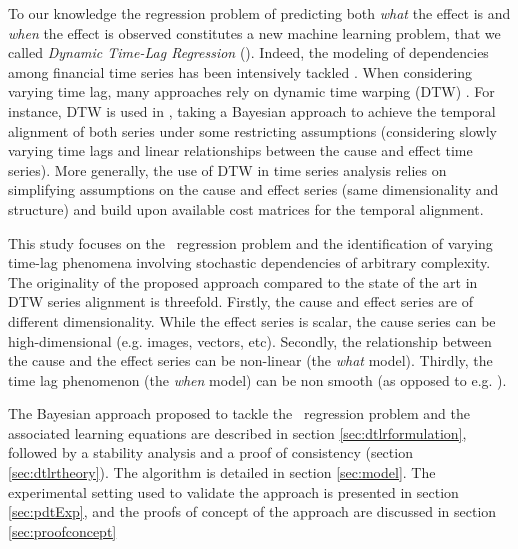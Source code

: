 To our knowledge the regression problem of predicting both {\em what} the effect is and {\em when} 
the effect is observed constitutes a new machine learning problem, that we called 
{\em Dynamic Time-Lag Regression} (\XX). Indeed, the modeling of dependencies among financial time 
series has been intensively tackled \citep{ZHOU2006195}. When considering varying time lag, many 
approaches rely on dynamic time warping (DTW) \citep{SakoeShiba1978}. For instance, DTW is used in 
\citet{SignalDiffusion}, taking a Bayesian approach to achieve the temporal alignment of both 
series under some restricting assumptions (considering slowly varying time lags and linear 
relationships between the cause and effect time series). More generally, the use of DTW in time 
series analysis relies on simplifying assumptions on the cause and effect series 
(same dimensionality and structure) and build upon available cost matrices for the temporal 
alignment. 

This study focuses on the \XX\ regression problem and the identification of varying time-lag 
phenomena involving stochastic dependencies of arbitrary complexity. The originality of the 
proposed approach compared to the state of the art in DTW series alignment is threefold. Firstly, 
the cause and effect series are of different dimensionality. While the effect series is scalar, the 
cause series can be high-dimensional (e.g. images, vectors, etc). Secondly, the relationship 
between the cause and the effect series can be non-linear (the {\em what} model). Thirdly, the time 
lag phenomenon (the {\em when} model) can be non smooth (as opposed to e.g. \citet{ZHOU2006195}).

The Bayesian approach proposed to tackle the \XX\ regression problem and the associated learning 
equations are described in section \ref{sec:dtlrformulation}, followed by a stability analysis and 
a proof of consistency (section \ref{sec:dtlrtheory}). The algorithm is detailed in section 
\ref{sec:model}. The experimental setting used to validate the approach is presented in section 
\ref{sec:pdtExp}, and the proofs of concept of the approach are discussed in section 
\ref{sec:proofconcept}

